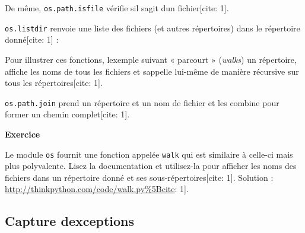 De même, \texttt{os.path.isfile} vérifie s\textquotesingle il
s\textquotesingle agit d\textquotesingle un fichier{[}cite: 1{]}.

\texttt{os.listdir} renvoie une liste des fichiers (et autres
répertoires) dans le répertoire donné{[}cite: 1{]} :

\begin{Shaded}
\begin{Highlighting}[]
\OperatorTok{\textgreater{}\textgreater{}\textgreater{}}
\NormalTok{[}\NormalTok{, }\NormalTok{, }\NormalTok{]}
\end{Highlighting}
\end{Shaded}

Pour illustrer ces fonctions, l\textquotesingle exemple suivant «
parcourt » (\emph{walks}) un répertoire, affiche les noms de tous les
fichiers et s\textquotesingle appelle lui-même de manière récursive sur
tous les répertoires{[}cite: 1{]}.

\begin{Shaded}
\begin{Highlighting}[]
\OperatorTok{=}

        \NormalTok{:}
\end{Highlighting}
\end{Shaded}

\texttt{os.path.join} prend un répertoire et un nom de fichier et les
combine pour former un chemin complet{[}cite: 1{]}.

\textbf{Exercice}

Le module \texttt{os} fournit une fonction appelée \texttt{walk} qui est
similaire à celle-ci mais plus polyvalente. Lisez la documentation et
utilisez-la pour afficher les noms des fichiers dans un répertoire donné
et ses sous-répertoires{[}cite: 1{]}. Solution :
\url{http://thinkpython.com/code/walk.py\%5Bcite}: 1{]}.

\hypertarget{capture-dexceptions}{%
\subsection{Capture
d\textquotesingle exceptions}\label{capture-dexceptions}}

